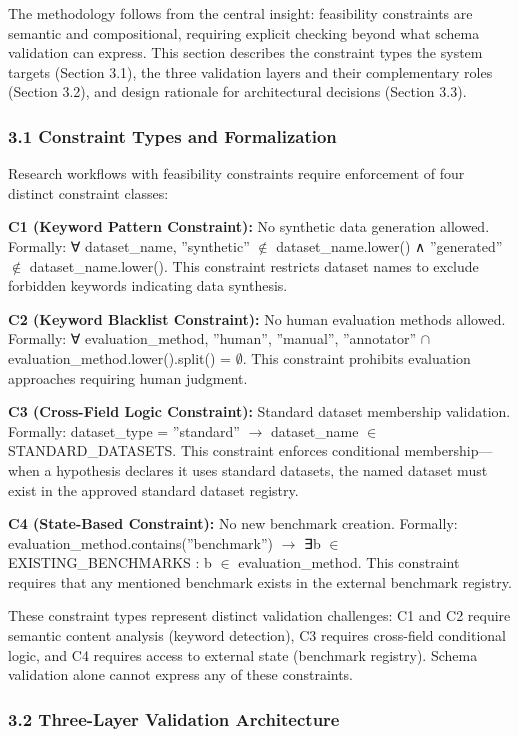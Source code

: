 
The methodology follows from the central insight: feasibility constraints are semantic and compositional, requiring explicit checking beyond what schema validation can express. This section describes the constraint types the system targets (Section 3.1), the three validation layers and their complementary roles (Section 3.2), and design rationale for architectural decisions (Section 3.3).

\subsubsection{3.1 Constraint Types and Formalization}

Research workflows with feasibility constraints require enforcement of four distinct constraint classes:

\textbf{C1 (Keyword Pattern Constraint):} No synthetic data generation allowed. Formally: ∀ dataset\_name, ''synthetic'' $\notin$ dataset\_name.lower() ∧ ''generated'' $\notin$ dataset\_name.lower(). This constraint restricts dataset names to exclude forbidden keywords indicating data synthesis.

\textbf{C2 (Keyword Blacklist Constraint):} No human evaluation methods allowed. Formally: ∀ evaluation\_method, {''human'', ''manual'', ''annotator''} $\cap$ evaluation\_method.lower().split() = $\emptyset$. This constraint prohibits evaluation approaches requiring human judgment.

\textbf{C3 (Cross-Field Logic Constraint):} Standard dataset membership validation. Formally: dataset\_type = ''standard'' $\rightarrow$ dataset\_name $\in$ STANDARD\_DATASETS. This constraint enforces conditional membership---when a hypothesis declares it uses standard datasets, the named dataset must exist in the approved standard dataset registry.

\textbf{C4 (State-Based Constraint):} No new benchmark creation. Formally: evaluation\_method.contains(''benchmark'') $\rightarrow$ ∃b $\in$ EXISTING\_BENCHMARKS : b $\in$ evaluation\_method. This constraint requires that any mentioned benchmark exists in the external benchmark registry.

These constraint types represent distinct validation challenges: C1 and C2 require semantic content analysis (keyword detection), C3 requires cross-field conditional logic, and C4 requires access to external state (benchmark registry). Schema validation alone cannot express any of these constraints.

\subsubsection{3.2 Three-Layer Validation Architecture}

